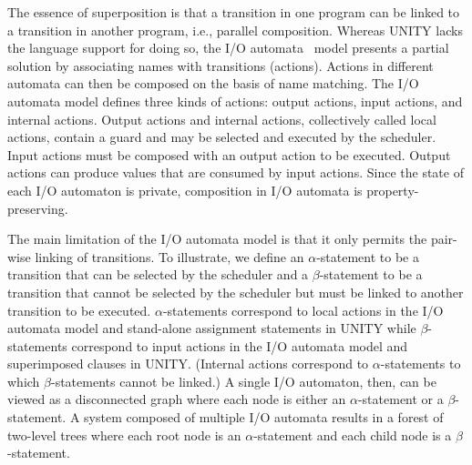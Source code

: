 The essence of superposition is that a transition in one program can be linked to a transition in another program, i.e., parallel composition.
Whereas UNITY lacks the language support for doing so, the I/O automata~\cite{nancy1996distributed} model presents a partial solution by associating names with transitions (actions).
Actions in different automata can then be composed on the basis of name matching.
The I/O automata model defines three kinds of actions:  output actions, input actions, and internal actions.
Output actions and internal actions, collectively called local actions, contain a guard and may be selected and executed by the scheduler.
Input actions must be composed with an output action to be executed.
Output actions can produce values that are consumed by input actions.
Since the state of each I/O automaton is private, composition in I/O automata is property-preserving.

The main limitation of the I/O automata model is that it only permits the pair-wise linking of transitions.
To illustrate, we define an $\alpha$-statement to be a transition that can be selected by the scheduler and a $\beta$-statement to be a transition that cannot be selected by the scheduler but must be linked to another transition to be executed.
$\alpha$-statements correspond to local actions in the I/O automata model and stand-alone assignment statements in UNITY while $\beta$-statements correspond to input actions in the I/O automata model and superimposed clauses in UNITY.
(Internal actions correspond to $\alpha$-statements to which $\beta$-statements cannot be linked.)
A single I/O automaton, then, can be viewed as a disconnected graph where each node is either an $\alpha$-statement or a $\beta$-statement.
A system composed of multiple I/O automata results in a forest of two-level trees where each root node is an $\alpha$-statement and each child node is a $\beta$-statement.

